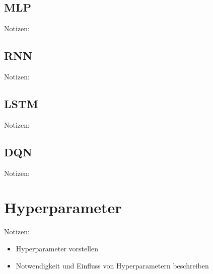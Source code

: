 \subsection{MLP}
Notizen:


\subsection{RNN}
Notizen:


\subsection{LSTM}
Notizen:


\subsection{DQN}
Notizen:


\section{Hyperparameter}
Notizen:
\begin{itemize}
	\item Hyperparameter vorstellen
	\item Notwendigkeit und Einfluss von Hyperparametern beschreiben
\end{itemize}
